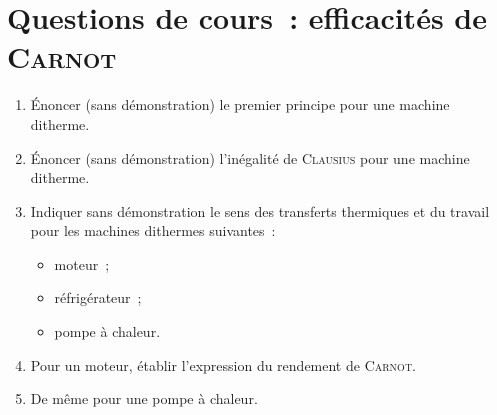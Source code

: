 \documentclass[../TDT5.tex]{subfiles}%
\begin{document}
\section{Questions de cours~: efficacités de \textsc{Carnot}}
\begin{enumerate}
	\item Énoncer (sans démonstration) le premier principe pour une machine
	      ditherme.
	\item Énoncer (sans démonstration) l'inégalité de \textsc{Clausius} pour une
	      machine ditherme.
	\item Indiquer sans démonstration le sens des transferts thermiques et du
	      travail pour les machines dithermes suivantes~:
	      \begin{itemize}
		      \item moteur~;
		      \item réfrigérateur~;
		      \item pompe à chaleur.
	      \end{itemize}
	\item Pour un moteur, établir l'expression du rendement de \textsc{Carnot}.
	\item De même pour une pompe à chaleur.
\end{enumerate}
\end{document}
